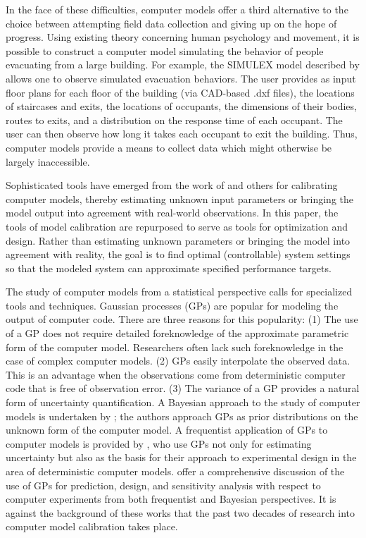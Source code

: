 \documentclass{article}
\begin{document}
In the face of these difficulties, computer models offer a third alternative to the choice between attempting field data collection and giving up on the hope of progress. Using existing theory concerning human psychology and movement, it is possible to construct a computer model simulating the behavior of people evacuating from a large building. For example, the SIMULEX model described by \cite{Thompson1995} allows one to observe simulated evacuation behaviors.
The user provides as input floor plans for each floor of the building (via CAD-based .dxf files), the locations of staircases and exits, the locations of occupants, the dimensions of their bodies, routes to exits, and a distribution on the response time of each occupant. 
The user can then observe how long it takes each occupant to exit the building.
Thus, computer models provide a means to collect data which might otherwise be largely inaccessible.

Sophisticated tools have emerged from the work of \cite{Kennedy2001,Williams2006,Bayarri2007} and others for calibrating computer models, thereby estimating unknown input parameters or bringing the model output into agreement with real-world observations.
In this paper, the tools of model calibration are repurposed to serve as tools for optimization and design.
Rather than estimating unknown parameters or bringing the model into agreement with reality, the goal is to find optimal (controllable) system settings so that the modeled system can approximate specified performance targets.

The study of computer models from a statistical perspective calls for specialized tools and techniques.
Gaussian processes (GPs) are popular for modeling the output of computer code. There are three reasons for this popularity: (1) The use of a GP does not require detailed foreknowledge of the approximate parametric form of the computer model.
Researchers often lack such foreknowledge in the case of complex computer models.
(2) GPs easily interpolate the observed data. This is an advantage when the observations come from deterministic computer code that is free of observation error. (3) The variance of a GP provides a natural form of uncertainty quantification. 
A Bayesian approach to the study of computer models is undertaken by \cite{Currin1991}; the authors approach GPs as prior distributions on the unknown form of the computer model. A frequentist application of GPs to computer models is provided by \cite{Sacks1989}, who use GPs not only for estimating uncertainty but also as the basis for their approach to experimental design in the area of deterministic computer models.  \cite{Santner2003a} offer a comprehensive discussion of the use of GPs for prediction, design, and sensitivity analysis with respect to computer experiments from both frequentist and Bayesian perspectives. It is against the background of these works that the past two decades of research into computer model calibration takes place.
\end{document}
